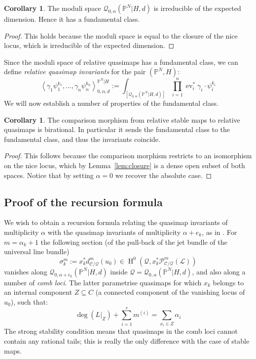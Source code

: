 \documentclass[11pt]{amsart}
\newcommand{\Q}[4]{\mathcal{Q}_{#1,#2}(#3,#4)}
\newcommand{\PP}{\mathbb P}
\newcommand{\HH}{\operatorname{H}}
\newcommand{\ev}{\operatorname{ev}}
\newcommand{\om}[1]{\mathcal{#1}}
\theoremstyle{definition}
\newtheorem{cor}[thm]{Corollary}
\theoremstyle{definition}
\newcommand{\ilemph}[1]{\emph{#1}}
\begin{document}
\begin{cor} The moduli space $\Q{0}{\alpha}{\PP^N|H}{d}$ is irreducible of the expected dimension. Hence it has a fundamental class. \end{cor}
\begin{proof} This holds because the moduli space is equal to the closure of the nice locus, which is irreducible of the expected dimension.\end{proof}

Since the moduli space of relative quasimaps has a fundamental class, we can define \emph{relative quasimap invariants} for the pair $(\PP^N,H)$:
\begin{equation*} \left\langle \gamma_1 \psi_1^{k_1} , \ldots, \gamma_n \psi_n^{k_n} \right\rangle_{0,\alpha,d}^{\PP^N|H} := \int_{[\Q{0}{\alpha}{\PP^N|H}{d}]} \prod_{i=1}^n \ev_i^* \gamma_i \cdot \psi_i^{k_i} \end{equation*}
We will now establish a number of properties of the fundamental class.
\begin{cor} \label{Comparison morphism birational} The comparison morphism from relative stable maps to relative quasimaps is birational. In particular it sends the fundamental class to the fundamental class, and thus the invariants coincide. \end{cor}
\begin{proof} This follows because the comparison morphism restricts to an isomorphism on the nice locus, which by Lemma~\ref{lem:closure} is a dense open subset of both spaces. Notice that by setting $\alpha=0$ we recover the absolute case. \end{proof}


\subsection{Proof of the recursion formula} \label{Subsection recursion formula for PN}
We wish to obtain a recursion formula relating the quasimap invariants of multiplicity $\alpha$ with the quasimap invariants of multiplicity $\alpha + e_k$, as in \cite[Theorem 2.6]{Ga}. For $m = \alpha_k + 1$ the following section (of the pull-back of the jet bundle of the universal line bundle)
\[
\sigma^m_k := x_k^*d^m_{\mathcal C/\om{Q}}(u_0)\in \HH^0(\om{Q},x_k^*\mathcal P^m_{\mathcal C/\mathcal Q}(\mathcal L))
\]
vanishes along $\Q{0}{\alpha+e_k}{\PP^N|H}{d}$ inside $\om{Q} = \Q{0}{\alpha}{\PP^N|H}{d}$, and also along a number of \ilemph{comb loci}.  The latter parametrise quasimaps for which $x_k$ belongs to an internal component $Z \subseteq C$ (a connected component of the vanishing locus of $u_0$), such that:
\begin{equation*}\deg(L|_{Z})+\sum_{i=1}^r m^{(i)}=\sum_{x_i\in Z}\alpha_i \end{equation*}
The strong stability condition means that quasimaps in the comb loci cannot contain any rational tails; this is really the only difference with the case of stable maps.
\end{document}
